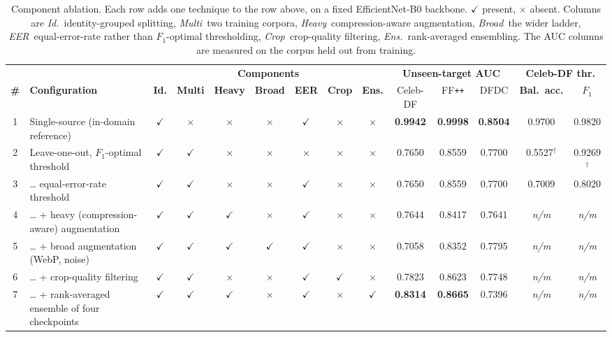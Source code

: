 \documentclass[journal,onecolumn]{IEEEtran}
\newcommand{\celebdf}{Celeb-DF}
\newcommand{\ffpp}{FF\texttt{++}}
\newcommand{\dfdc}{DFDC}
\newcommand{\best}[1]{\textbf{#1}}
\newcommand{\yes}{\ensuremath{\checkmark}}
\newcommand{\no}{\ensuremath{\times}}
\newcommand{\nm}{\textit{\footnotesize n/m}}
\begin{document}
\begin{table}[!t]
\centering
\caption{Component ablation. Each row adds one technique to the row above, on a
fixed EfficientNet-B0 backbone. \yes{} present, \no{} absent. Columns are
\emph{Id.}~identity-grouped splitting, \emph{Multi}~two training corpora,
\emph{Heavy}~compression-aware augmentation, \emph{Broad}~the wider ladder,
\emph{EER}~equal-error-rate rather than $F_1$-optimal thresholding,
\emph{Crop}~crop-quality filtering, \emph{Ens.}~rank-averaged ensembling. The AUC
columns are measured on the corpus held out from training.}
\label{tab:components}
\footnotesize
\setlength{\tabcolsep}{3pt}
\begin{tabular}{clcccccccccccc}
\toprule
& & \multicolumn{7}{c}{\textbf{Components}}
  & \multicolumn{3}{c}{\textbf{Unseen-target AUC}}
  & \multicolumn{2}{c}{\textbf{\celebdf{} thr.}} \\
\cmidrule(lr){3-9}\cmidrule(lr){10-12}\cmidrule(lr){13-14}
\textbf{\#} & \textbf{Configuration}
& \textbf{Id.} & \textbf{Multi} & \textbf{Heavy} & \textbf{Broad}
& \textbf{EER} & \textbf{Crop} & \textbf{Ens.}
& \celebdf{} & \ffpp{} & \dfdc{}
& \textbf{Bal.\ acc.} & \textbf{$F_1$} \\
\midrule
1 & Single-source (in-domain reference)
  & \yes & \no  & \no  & \no  & \yes & \no  & \no
  & \best{0.9942} & \best{0.9998} & \best{0.8504} & 0.9700 & 0.9820 \\
\midrule
2 & Leave-one-out, $F_1$-optimal threshold
  & \yes & \yes & \no  & \no  & \no  & \no  & \no
  & 0.7650 & 0.8559 & 0.7700 & 0.5527$^{\dagger}$ & 0.9269$^{\dagger}$ \\
3 & \dots{} equal-error-rate threshold
  & \yes & \yes & \no  & \no  & \yes & \no  & \no
  & 0.7650 & 0.8559 & 0.7700 & 0.7009 & 0.8020 \\
4 & \dots{} + heavy (compression-aware) augmentation
  & \yes & \yes & \yes & \no  & \yes & \no  & \no
  & 0.7644 & 0.8417 & 0.7641 & \nm & \nm \\
5 & \dots{} + broad augmentation (WebP, noise)
  & \yes & \yes & \yes & \yes & \yes & \no  & \no
  & 0.7058 & 0.8352 & 0.7795 & \nm & \nm \\
6 & \dots{} + crop-quality filtering
  & \yes & \yes & \no  & \no  & \yes & \yes & \no
  & 0.7823 & 0.8623 & 0.7748 & \nm & \nm \\
7 & \dots{} + rank-averaged ensemble of four checkpoints
  & \yes & \yes & \yes & \no  & \yes & \no  & \yes
  & \best{0.8314} & \best{0.8665} & 0.7396 & \nm & \nm \\
\bottomrule
\end{tabular}


\end{table}
\end{document}
